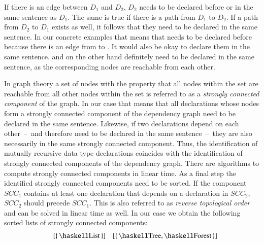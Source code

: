 If there is an edge between $D_1$ and $D_2$, $D_2$ needs to be declared before or in the same sentence as $D_1$.
The same is true if there is a path from $D_1$ to $D_2$.
If a path from $D_2$ to $D_1$ exists as well, it follows that they need to be declared in the same sentence.
In our concrete examples that means that  needs to be declared before  because there is an edge from  to .
It would also be okay to declare them in the same sentence.
 and  on the other hand definitely need to be declared in the same sentence, as the corresponding nodes are reachable from each other.

In graph theory a set of nodes with the property that all nodes within the set are reachable from all other nodes within the set is referred to as a \textit{strongly connected component} of the graph.
In our case that means that all declarations whose nodes form a strongly connected component of the dependency graph need to be declared in the same sentence.
Likewise, if two declarations depend on each other~--~and therefore need to be declared in the same sentence~--~they are also necessarily in the same strongly connected component.
Thus, the identification of mutually recursive data type declarations coincides with the identification of strongly connected components of the dependency graph.
There are algorithms to compute strongly connected components in linear time.
As a final step the identified strongly connected components need to be sorted.
If the component $SCC_1$ contains at least one declaration that depends on a declaration in $SCC_2$, $SCC_2$ should precede $SCC_1$.
This is also referred to as \textit{reverse topological order} and can be solved in linear time as well.
In our case we obtain the following sorted lists of strongly connected components:
\begin{align*}
  [\{\, \haskellM{B} \,\}, \{\, \haskellM{A} \,\}]
  && [\{\, \haskellM{List} \,\}]
  && [\{\, \haskellM{Tree}, \haskellM{Forest} \,\}]
\end{align*}

